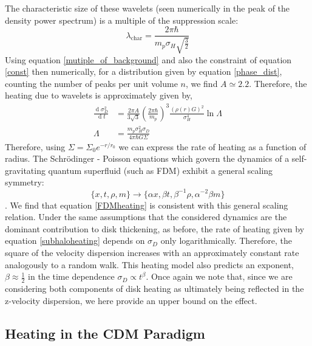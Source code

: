 \documentclass[usenatbib]{mnras}
\renewcommand{\d}[1]{\! \mathrm{d}#1 \:}
\newcommand{\deriv}[2]{\frac{\d{#1}}{\d{#2}}}
\renewcommand{\d}[1]{\ensuremath{\operatorname{d}\!{#1}}}
\begin{document}
The characteristic size of these wavelets (seen numerically in the peak of the density power spectrum) is a multiple of the suppression scale:
\begin{equation} \label{characteristic_wavelength}
\lambda_{\text{char}} = \frac{ 2 \pi \hbar}{m_p \sigma_H \sqrt{\frac{3}{2}}} 
\end{equation}
Using equation \eqref{mutiple_of_background}
and also the constraint of equation \eqref{const} then numerically, for a distribution given by equation \eqref{phase_dist}, counting the number of peaks per unit volume $n$, we find $A\simeq 2.2$.
Therefore, the heating due to wavelets is approximately given by,
\begin{subequations} \label{FDMheating}
\begin{align}
\deriv{\sigma_D^2}{t} & = \frac{2 \pi A}{3 \sqrt{3}} \left( \frac{2 \pi \hbar }{m_p} \right)^3 \frac{(\rho(r) G)^2}{\sigma_H^4} \ln{\Lambda}
\\
\Lambda & = \frac{m_p\sigma_H^2 \sigma_D}{4 \pi \hbar G \Sigma}
\end{align}
\end{subequations}
Therefore, using $\Sigma = \Sigma_0 e^{-r/r_0}$ we can express the rate of heating as a function of radius. The Schr\"{o}dinger - Poisson equations which govern the dynamics of a self-gravitating quantum superfluid (such as FDM) exhibit a general scaling symmetry:
\begin{equation}
\{ x, t , \rho, m \} \to \{\alpha x, \beta t, \beta^{-1} \rho, \alpha^{-2} \beta m \} 
\end{equation}
\noindent \citep{Schrodinger-Poisson}.
We find that equation \eqref{FDMheating} is consistent with this general scaling relation. Under the same assumptions that the considered dynamics are the dominant contribution to disk thickening, as before, the rate of heating given by equation \eqref{subhaloheating} depends on $\sigma_D$ only logarithmically. Therefore, the square of the velocity dispersion increases with an approximately constant rate analogously to a random walk. This heating model also predicts an exponent, $\beta \approx \tfrac{1}{2}$ in the time dependence $\sigma_D \propto t^{\beta}$. Once again we note that, since we are considering both components of disk heating as ultimately being reflected in the z-velocity dispersion, we here provide an upper bound on the effect. 
\subsection{Heating in the CDM Paradigm}
\end{document}
